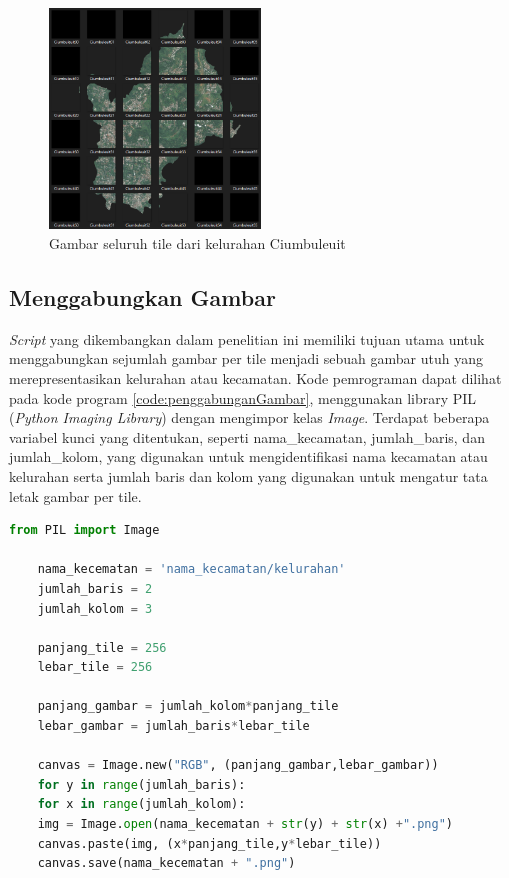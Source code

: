 \begin{figure}[H]
	\centering
	\includegraphics[width=0.5\textwidth]{Gambar/result gambar per tile.png}
	\caption{Gambar seluruh tile dari kelurahan Ciumbuleuit}
	\label{fig:pertileciumbuleuit}
\end{figure} 

\subsection{Menggabungkan Gambar}
\textit{Script} yang dikembangkan dalam penelitian ini memiliki tujuan utama untuk menggabungkan sejumlah gambar per tile menjadi sebuah gambar utuh yang merepresentasikan kelurahan atau kecamatan. Kode pemrograman dapat dilihat pada kode program \ref{code:penggabunganGambar}, menggunakan library PIL (\textit{Python Imaging Library}) dengan mengimpor kelas \textit{Image}. Terdapat beberapa variabel kunci yang ditentukan, seperti nama\_kecamatan, jumlah\_baris, dan jumlah\_kolom, yang digunakan untuk mengidentifikasi nama kecamatan atau kelurahan serta jumlah baris dan kolom yang digunakan untuk mengatur tata letak gambar per tile.

\begin{lstlisting}[language=Python, caption=Script Penggabungan Gambar,label={code:penggabunganGambar}]
	from PIL import Image
	
	nama_kecematan = 'nama_kecamatan/kelurahan'
	jumlah_baris = 2
	jumlah_kolom = 3
	
	panjang_tile = 256
	lebar_tile = 256
	
	panjang_gambar = jumlah_kolom*panjang_tile
	lebar_gambar = jumlah_baris*lebar_tile
	
	canvas = Image.new("RGB", (panjang_gambar,lebar_gambar))
	for y in range(jumlah_baris):
	for x in range(jumlah_kolom):
	img = Image.open(nama_kecematan + str(y) + str(x) +".png")
	canvas.paste(img, (x*panjang_tile,y*lebar_tile))
	canvas.save(nama_kecematan + ".png")
	
\end{lstlisting}

